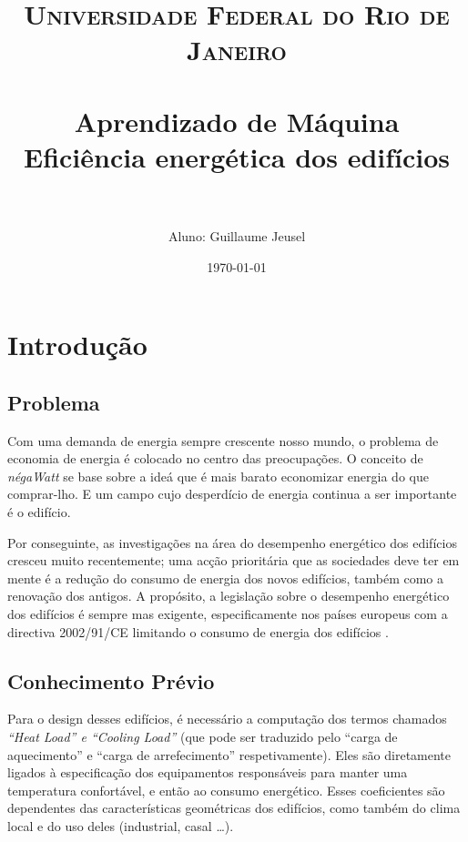 \documentclass[paper=a4, fontsize=11pt]{article} %
\title{
\normalfont \normalsize
\textsc{Universidade Federal do Rio de Janeiro} \\ [25pt] %
\horrule{0.5pt} \\[0.4cm] %
\huge Aprendizado de Máquina\\Eficiência energética dos edifícios \\ %
\horrule{2pt} \\[0.5cm] %
}
\author{Aluno: Guillaume Jeusel} %
\date{\normalsize\today} %
\date{\parbox{\linewidth}\bigskip%
  Professor: Alexandre G. Evsukoff \endgraf\bigskip
  Disciplina: Inteligência Computacional \endgraf\bigskip
  {\centering\normalsize\today\endgraf}
  }
\numberwithin{equation}{section} %
\numberwithin{figure}{section} %
\numberwithin{table}{section} %
\begin{document}
\maketitle %
\newpage

\tableofcontents %
\newpage


\section{Introdução}

\subsection{Problema}
Com uma demanda de energia sempre crescente nosso mundo, o problema de economia de energia é colocado no centro das preocupações.
O conceito de \emph{négaWatt} \cite{ref_negawatt} se base sobre a ideá que é mais barato economizar energia do que comprar-lho.
E um campo cujo desperdício de energia continua a ser importante é o edifício.

Por conseguinte, as investigações na área do desempenho energético dos edifícios cresceu muito recentemente;
uma acção prioritária que as sociedades deve ter em mente é a redução do consumo de energia dos novos edifícios, também como a renovação dos antigos.
A propósito, a legislação sobre o desempenho energético dos edifícios é sempre mas exigente,
especificamente nos países europeus com a directiva 2002/91/CE limitando o consumo de energia dos edifícios \cite{ref_europ_energ}.


\subsection{Conhecimento Prévio}
Para o design desses edifícios, é necessário a computação dos termos chamados \emph{“Heat Load” e “Cooling Load”}
(que pode ser traduzido pelo “carga de aquecimento” e “carga de arrefecimento” respetivamente).
Eles são diretamente ligados à especificação dos equipamentos responsáveis para manter uma temperatura confortável, e então ao consumo energético.
Esses coeficientes são dependentes das características geométricas dos edifícios, como também do clima local e do uso deles (industrial, casal …).
\end{document}
